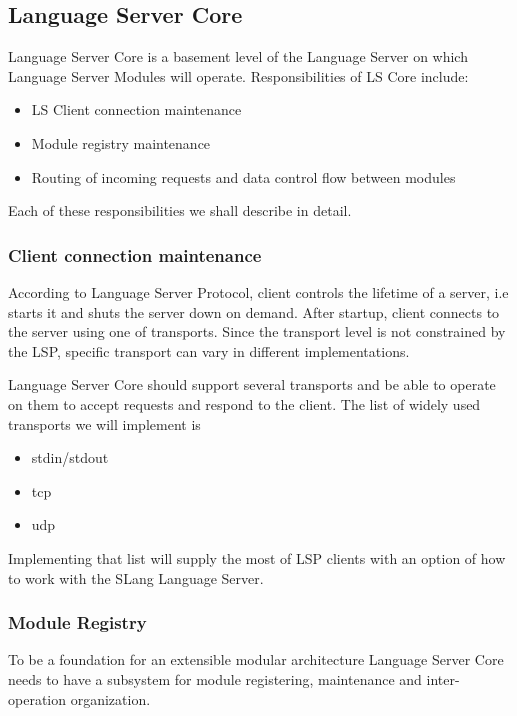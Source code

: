\subsection{Language Server Core}
\label{sec:met:arch:core}
Language Server Core is a basement level of the Language Server on which Language Server Modules will operate.
Responsibilities of LS Core include:
\begin{itemize}
    \item LS Client connection maintenance
    \item Module registry maintenance
    \item Routing of incoming requests and data control flow between modules
\end{itemize}

Each of these responsibilities we shall describe in detail.

\subsubsection{Client connection maintenance}
\label{sec:met:arch:core:connection_maintenance}
According to Language Server Protocol\cite{Sourcegraph}, client controls the lifetime of a server, 
i.e starts it and shuts the server down on demand. After startup, client connects to the server
using one of transports. Since the transport level is not constrained by the LSP, specific transport 
can vary in different implementations.

Language Server Core should support several transports and be able to operate on them to accept requests 
and respond to the client. The list of widely used transports we will implement is
\begin{itemize}
    \item stdin/stdout
    \item tcp
    \item udp
\end{itemize}
Implementing that list will supply the most of LSP clients with an option of how to work with the SLang Language Server.  

\subsubsection{Module Registry}
\label{sec:met:arch:core:module_registry}

To be a foundation for an extensible modular architecture Language Server Core needs to have a subsystem 
for module registering, maintenance and inter-operation organization.

